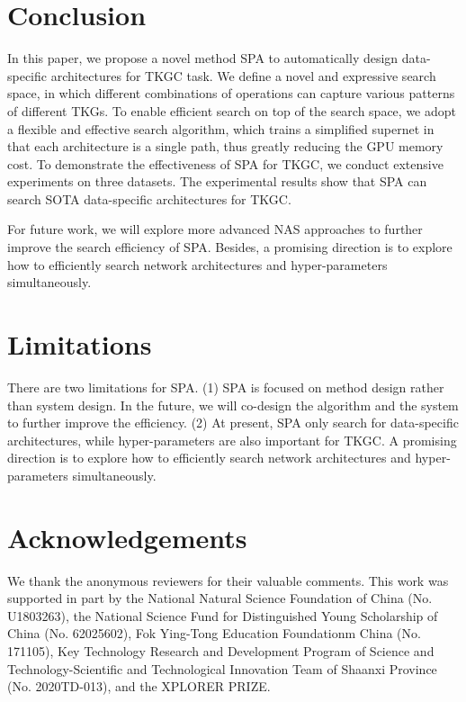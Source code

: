 \documentclass[11pt]{article}
\begin{document}
\section{Conclusion}

In this paper, 
we propose a novel method SPA to automatically design data-specific architectures for TKGC task. We define a novel and expressive search space, 
in which different combinations of operations can capture various patterns of different TKGs. 
To enable efficient search on top of the search space, 
we adopt a flexible and effective search algorithm, 
which trains a simplified supernet in that each architecture is a single path, 
thus greatly reducing the GPU memory cost. 
To demonstrate the effectiveness of SPA for TKGC, 
we conduct extensive experiments on three datasets. 
The experimental results show that SPA can search SOTA data-specific architectures for TKGC.

For future work, 
we will explore more advanced NAS approaches to further improve the search efficiency of SPA. 
Besides, 
a promising direction is to explore how to efficiently search network architectures and hyper-parameters simultaneously.

\clearpage

\section*{Limitations}

There are two limitations for SPA. (1) SPA is focused on method design rather than system design. In the future, we will co-design the algorithm and the system to further improve the efficiency. (2) At present, SPA only search for data-specific architectures, while hyper-parameters are also important for TKGC. A promising direction is to explore how to efficiently search network architectures and hyper-parameters simultaneously.

\section*{Acknowledgements}
We thank the anonymous reviewers for their valuable comments. 
This work was supported in part by
the National Natural Science Foundation of China (No. U1803263),
the National Science Fund for Distinguished Young Scholarship of China (No. 62025602),  
Fok Ying-Tong Education Foundationm China (No. 171105), 
Key Technology Research and Development Program of Science and Technology-Scientific and Technological Innovation Team of Shaanxi Province (No. 2020TD-013),
and the XPLORER PRIZE. 
\end{document}
